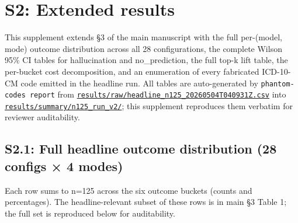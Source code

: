 \section{S2: Extended results}\label{s2-extended-results}

This supplement extends §3 of the main manuscript with the full
per-(model, mode) outcome distribution across all 28 configurations,
the complete Wilson 95\% CI tables for hallucination and
no\_prediction, the full top-k lift table, the per-bucket cost
decomposition, and an enumeration of every fabricated ICD-10-CM code
emitted in the headline run. All tables are auto-generated by
\texttt{phantom-codes\ report} from
\href{https://github.com/briankfung/phantom-codes/blob/main/BENCHMARK.md}{\texttt{results/raw/headline\_n125\_20260504T040931Z.csv}}
into \href{https://github.com/briankfung/phantom-codes/tree/main/results/summary/n125_run_v2/}{\texttt{results/summary/n125\_run\_v2/}};
this supplement reproduces them verbatim for reviewer auditability.

\subsection{S2.1: Full headline outcome distribution (28 configs × 4 modes)}\label{s2.1-full-headline-outcome-distribution-28-configs-4-modes}

Each row sums to n=125 across the six outcome buckets (counts and
percentages). The headline-relevant subset of these rows is in main
§3 Table 1; the full set is reproduced below for auditability.

